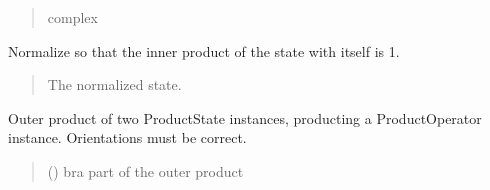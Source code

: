 \documentclass[letterpaper,10pt,english]{sphinxmanual}
\begin{document}
\begin{fulllineitems}
\begin{fulllineitems}
\begin{quote}
\begin{description}
\sphinxAtStartPar
complex

\end{description}\end{quote}

\end{fulllineitems}


\begin{fulllineitems}
\label{\detokenize{spinbox:spinbox.core.ProductState.normalize}}
\pysigstartsignatures
{}
\pysigstopsignatures
\sphinxAtStartPar
Normalize so that the inner product of the state with itself is 1.
\begin{quote}\begin{description}
\sphinxAtStartPar
The normalized state.

\sphinxAtStartPar
{\hyperref[\detokenize{spinbox:spinbox.core.ProductState}]{}}

\end{description}\end{quote}

\end{fulllineitems}


\begin{fulllineitems}
\label{\detokenize{spinbox:spinbox.core.ProductState.outer}}
\pysigstartsignatures
{}
\pysigstopsignatures
\sphinxAtStartPar
Outer product of two ProductState instances, producting a ProductOperator instance. Orientations must be correct.
\begin{quote}\begin{description}
\sphinxAtStartPar
{} ({\hyperref[\detokenize{spinbox:spinbox.core.ProductState}]{}}) \textendash{} bra part of the outer product


\end{description}
\end{quote}
\end{fulllineitems}
\end{fulllineitems}
\end{document}
